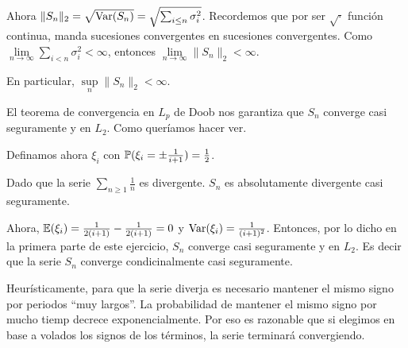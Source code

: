 Ahora $\| S_n \|_2 = \sqrt{\text{Var}\! \left( S_n \right)} = \sqrt{\sum_{i \leq n} \sigma_i^2}$. Recordemos que por ser  $\sqrt{\cdot}$
función continua, manda sucesiones convergentes en sucesiones convergentes. Como 
$\lim\limits_{n \rightarrow \infty} \sum\limits_{i < n} \sigma_i^2 < \infty$, 
entonces $\lim\limits_{n \rightarrow \infty}\| S_n \|_2 < \infty$.\pn

En particular, $\sup\limits_n \| S_n \|_2 < \infty$.\pn

El teorema de convergencia en $L_p$ de Doob nos garantiza que $S_n$ converge casi seguramente y en $L_2$. Como queríamos
hacer ver.\pn

Definamos ahora $\xi_i$ con $\mathbb{P}(\xi_i = \pm \frac{1}{i+1}) = \frac{1}{2}$.

Dado que la serie $\sum_{n \geq 1} \frac{1}{n}$ es divergente. $S_n$ es absolutamente divergente casi seguramente.\pn

Ahora, $\mathbb{E}(\xi_i) = \frac{1}{2(i+1)}-\frac{1}{2(i+1)} = 0$ y $\text{Var}\! \left( \xi_i \right) = \frac{1}{(i+1)^2}$. Entonces, por lo dicho en la primera
parte de este ejercicio, $S_n$ converge casi seguramente y en $L_2$. Es decir que la serie $S_n$ converge condicinalmente casi seguramente.\pn

Heurísticamente, para que la serie diverja es necesario mantener el mismo signo por periodos ``muy largos''. La probabilidad de mantener el 
mismo signo por mucho tiemp decrece exponencialmente. Por eso es razonable que si elegimos en base a volados los signos de los términos,
la serie terminará convergiendo.
